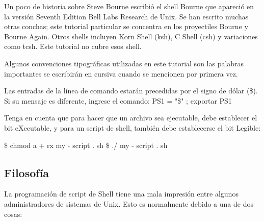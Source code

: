 \documentclass{article}
\begin{document}
Un poco de historia sobre Steve Bourne escribió el shell Bourne que apareció en la versión Seventh Edition Bell Labs Research de Unix. 
Se han escrito muchas otras conchas; este tutorial particular se concentra en los proyectiles Bourne y Bourne Again. 
Otros shells incluyen Korn Shell (ksh), C Shell (csh) y variaciones como tcsh. 
Este tutorial no cubre esos shell.

Algunos convenciones tipográficas utilizadas en este tutorial
son las palabras importantes se escribirán en cursiva cuando se mencionen por primera vez.

Las entradas de la línea de comando estarán precedidas por el signo de dólar (\$). Si su mensaje es diferente, ingrese el comando:
PS1 = "\$" ; exportar PS1 

Tenga en cuenta que para hacer que un archivo sea ejecutable, debe establecer el bit eXecutable, y para un script de shell, también debe establecerse el bit Legible:

\$ chmod a + rx my - script . sh
\$ ./ my - script . sh

\subsection{Filosofía}
La programación de script de Shell tiene una mala impresión entre algunos administradores de sistemas de Unix. Esto es normalmente debido a una de dos cosas:
\end{document}
